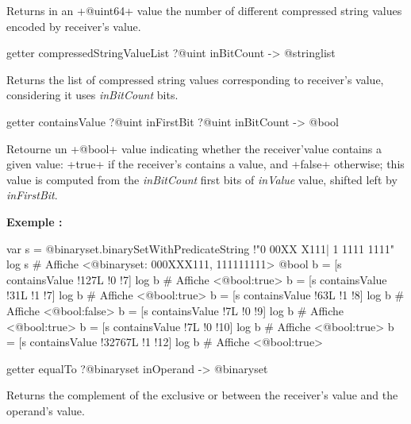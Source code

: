 Returns in an \ggs+@uint64+ value the number of different compressed string values encoded by receiver's value.




\begin{galgasbox}
getter compressedStringValueList ?@uint inBitCount -> @stringlist
\end{galgasbox}

Returns the list of compressed string values corresponding to receiver's value, considering it uses \emph{inBitCount} bits.











\begin{galgasbox}
getter containsValue ?@uint inFirstBit ?@uint inBitCount -> @bool
\end{galgasbox}


Retourne un \ggs+@bool+ value indicating whether the receiver'value contains a given value: \ggs+true+ if the receiver's contains a value, and \ggs+false+ otherwise; this value is computed from the \emph{inBitCount} first bits of \emph{inValue} value, shifted left by \emph{inFirstBit}.


\textbf{Exemple :}
\begin{galgas}
var s = @binaryset.binarySetWithPredicateString {!"0 00XX X111| 1 1111 1111"}
log s # Affiche <@binaryset: 000XXX111, 111111111>
@bool b = [s containsValue !127L !0 !7]
log b # Affiche <@bool:true>
b = [s containsValue !31L !1 !7]
log b # Affiche <@bool:true>
b = [s containsValue !63L !1 !8]
log b # Affiche <@bool:false>
b = [s containsValue !7L !0 !9]
log b # Affiche <@bool:true>
b = [s containsValue !7L !0 !10]
log b # Affiche <@bool:true>
b = [s containsValue !32767L !1 !12]
log b # Affiche <@bool:true>
\end{galgas}









\begin{galgasbox}
getter equalTo ?@binaryset inOperand -> @binaryset
\end{galgasbox}

Returns the complement of the exclusive or between the receiver's value and the operand's value.

